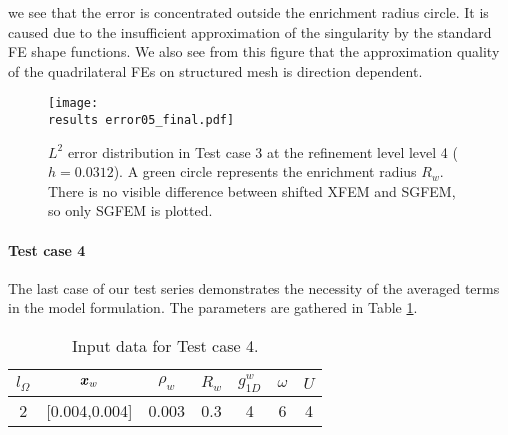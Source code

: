 we see that the error is concentrated outside the enrichment radius circle. It is caused due to the insufficient approximation of the singularity
by the standard FE shape functions. We also see from this figure that the approximation quality of the quadrilateral FEs on structured mesh is direction dependent.
%
\begin{figure}[!htb]
  \centering    
  \texttt{[image: \\results error05\_final.pdf]}
  \caption[Error distribution in Test case 3]{$L^2$ error distribution in Test case 3 at the refinement level level 4 ($h=0.0312$).
  A green circle represents the enrichment radius $R_w$. There is no visible difference between shifted XFEM and SGFEM, so only SGFEM is plotted.}
  \label{fig:error_distribution_test3}
\end{figure}
%

\paragraph{Test case 4}
The last case of our test series demonstrates the necessity of the averaged terms in the model formulation.
The parameters are gathered in Table \ref{tab:test_case_4_data}.
%
\begin{table}[!htb]
\begin{center}
\begin{tabular}{ccccccc}
\toprule
$l_\Omega$ & $\mathbf{\boldsymbol{x}}_w$  & $\rho_w$ & $R_w$ & $g^w_{1D}$ & $\omega$ & $U$ \\
\midrule
2 & [0.004,0.004] & 0.003 & 0.3 & 4 & 6 & 4\\
\bottomrule
\end{tabular}
\caption{Input data for Test case 4.}
\label{tab:test_case_4_data}
\end{center}
\end{table}
%

